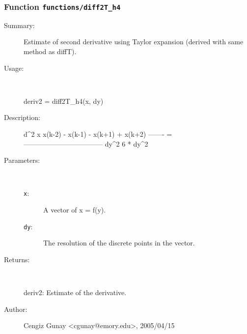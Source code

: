 \subsubsection[Function \texttt{diff2T\_h4}]{Function \texttt{functions/diff2T\_h4}}%
%
\label{ref_functions__diff2T_h4}%
\hypertarget{ref_functions__diff2T_h4}{}%
\begin{description}
\item[Summary:]Estimate of second derivative using Taylor expansion (derived with same method as diffT).
%
\item[Usage:]~%
\begin{lyxcode}%
deriv2 = diff2T\_h4(x, dy)
%
\end{lyxcode}%
%
\item[Description:]%
d\textasciicircum{}2 x     x(k-2) - x(k-1) - x(k+1) + x(k+2)
  ------- = -----------------------------------
   dy\textasciicircum{}2		6 * dy\textasciicircum{}2
\item[Parameters:]~
\begin{description}%
\item[\texttt{x}:]
 A vector of x = f(y).
\item[\texttt{dy}:]
 The resolution of the discrete points in the vector.
\end{description}%
%
\item[Returns:]~

 	deriv2: Estimate of the derivative.
%
%
%
\item[Author:]%
Cengiz Gunay <cgunay@emory.edu>, 2005/04/15%
\end{description}
\methodline%
